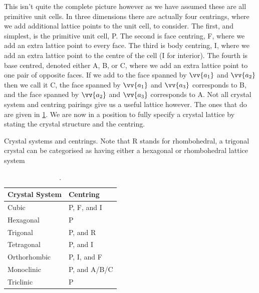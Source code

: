 \documentclass[fleqn]{NotesClass}
\begin{document}
    This isn't quite the complete picture however as we have assumed these are all primitive unit cells.
    In three dimensions there are actually four centrings, where we add additional lattice points to the unit cell, to consider.
    The first, and simplest, is the primitive unit cell, P.
    The second is face centring, F, where we add an extra lattice point to every face.
    The third is body centring, I, where we add an extra lattice point to the centre of the cell (I for interior).
    The fourth is base centred, denoted either A, B, or C, where we add an extra lattice point to one pair of opposite faces.
    If we add to the face spanned by \(\vv{a_1}\) and \(\vv{a_2}\) then we call it C, the face spanned by \(\vv{a_1}\) and \(\vv{a_3}\) corresponds to B, and the face spanned by \(\vv{a_2}\) and \(\vv{a_3}\) corresponds to A.
    Not all crystal system and centring pairings give us a useful lattice however.
    The ones that do are given in \cref{tab:crystal system centring}.
    We are now in a position to fully specify a crystal lattice by stating the crystal structure and the centring.
    \begin{table}
        \caption[Crystal structure centrings].{Crystal systems and centrings. Note that R stands for rhombohedral, a trigonal crystal can be categorised as having either a hexagonal or rhombohedral lattice system}
        \label{tab:crystal system centring}
        \begin{tabular}{ll}\toprule
            Crystal System & Centring\\\midrule
            Cubic & P, F, and I\\
            Hexagonal & P\\
            Trigonal & P, and R\\
            Tetragonal & P, and I\\
            Orthorhombic & P, I, and F\\
            Monoclinic & P, and A/B/C\\
            Triclinic & P\\\bottomrule
        \end{tabular}
    \end{table}
\end{document}

